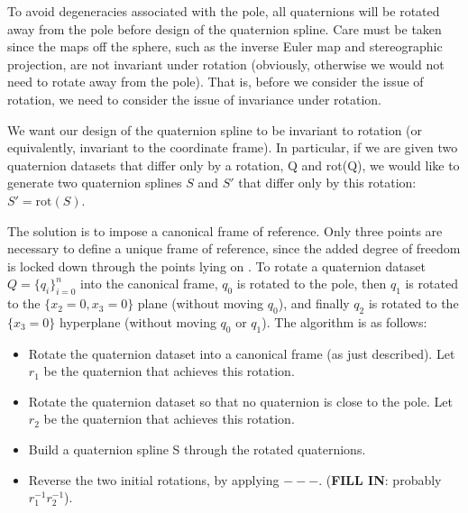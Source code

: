 \documentclass[11pt]{article}
\begin{document}
To avoid degeneracies associated with the pole, all quaternions 
will be rotated away from the pole before design of the quaternion spline.
Care must be taken since the maps off the sphere, such as the inverse Euler map 
and stereographic projection, are not invariant under rotation
(obviously, otherwise we would not need to rotate away from the pole).
That is, before we consider the issue of rotation, we need to consider the issue of
invariance under rotation.

We want our design of the quaternion spline to be invariant to rotation
(or equivalently, invariant to the coordinate frame).
In particular, if we are given two quaternion datasets that differ only by a rotation,
Q and rot(Q), we would like to generate two quaternion splines $S$ and $S'$
that differ only by this rotation: $S' = \mbox{rot}(S)$.

The solution is to impose a canonical frame of reference.
Only three points are necessary to define a unique frame of reference,
since the added degree of freedom is locked down through the points lying on .
To rotate a quaternion dataset $Q = \{q_i\}_{i=0}^n$ into the canonical frame,
$q_0$ is rotated to the pole, 
then $q_1$ is rotated to the $\{x_2=0,x_3=0\}$ plane (without moving $q_0$),
and finally $q_2$ is rotated to the $\{x_3=0\}$ hyperplane
(without moving $q_0$ or $q_1$).
The algorithm is as follows:
\begin{itemize}
\item Rotate the quaternion dataset into a canonical frame (as just described).
      Let $r_1$ be the quaternion that achieves this rotation.
\item Rotate the quaternion dataset so that no quaternion is close to the pole.
      Let $r_2$ be the quaternion that achieves this rotation.
\item Build a quaternion spline S through the rotated quaternions.
\item Reverse the two initial rotations, by applying $---$.  ({\bf FILL IN}: probably $r_1^{-1} r_2^{-1}$).
\end{itemize}
\end{document}
